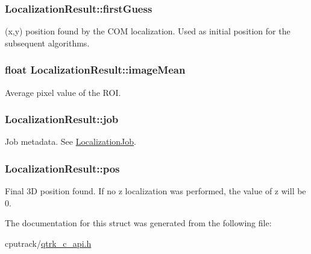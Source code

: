 \subsubsection[{\texorpdfstring{first\+Guess}{firstGuess}}]{ Localization\+Result\+::first\+Guess}\hypertarget{struct_localization_result_a44c7351e9eb9410375c10fcf4e0f0cf9}{}\label{struct_localization_result_a44c7351e9eb9410375c10fcf4e0f0cf9}


(x,y) position found by the C\+OM localization. Used as initial position for the subsequent algorithms. 

\subsubsection[{\texorpdfstring{image\+Mean}{imageMean}}]{\setlength{\rightskip}{0pt plus 5cm}float Localization\+Result\+::image\+Mean}\hypertarget{struct_localization_result_aba2a42711bc890c8620419f7dc906db9}{}\label{struct_localization_result_aba2a42711bc890c8620419f7dc906db9}


Average pixel value of the R\+OI. 

\subsubsection[{\texorpdfstring{job}{job}}]{ Localization\+Result\+::job}\hypertarget{struct_localization_result_a9a6b25c5cc92fe13bae3d0a5d37360f3}{}\label{struct_localization_result_a9a6b25c5cc92fe13bae3d0a5d37360f3}


Job metadata. See \hyperlink{struct_localization_job}{Localization\+Job}. 

\subsubsection[{\texorpdfstring{pos}{pos}}]{ Localization\+Result\+::pos}\hypertarget{struct_localization_result_a546f66485662c35bc75121513b6d1a60}{}\label{struct_localization_result_a546f66485662c35bc75121513b6d1a60}


Final 3D position found. If no z localization was performed, the value of z will be 0. 



The documentation for this struct was generated from the following file\+:\begin{DoxyCompactItemize}
\item 
cputrack/\hyperlink{qtrk__c__api_8h}{qtrk\+\_\+c\+\_\+api.\+h}\end{DoxyCompactItemize}
